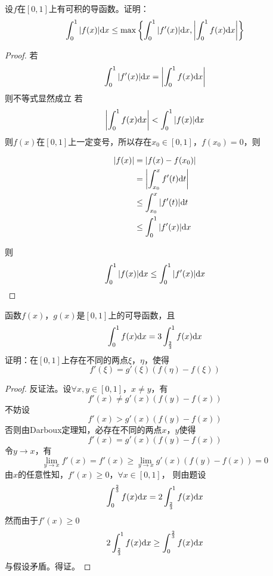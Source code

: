 \begin{proposition}

    设$f$在$[0, 1]$上有可积的导函数。证明：
    \[\int_{0}^{1}{|f(x)|}\mathrm{d} x \leq \max\left\{ \int_{0}^{1}{|f'(x)|}\mathrm{d} x,  \left| \int_{0}^{1}{f(x)}\mathrm{d} x \right| \right\}\]

\end{proposition}

\begin{proof}
    
    若
    \[\int_{0}^{1}{|f'(x)|}\mathrm{d} x = \left| \int_{0}^{1}{f(x)}\mathrm{d} x \right|\]
    则不等式显然成立
    若
    \[\left| \int_{0}^{1}{f(x)}\mathrm{d} x \right| < \int_{0}^{1}{|f(x)|}\mathrm{d} x\]
    则$f(x)$在$[0, 1]$上一定变号，所以存在$x_0 \in [0, 1]$，$f(x_0) = 0$，则

    \begin{align*}
        |f(x)| & = |f(x) - f(x_0)| \\
        & = \left| \int_{x_0}^{x}{f'(t)}\mathrm{d} t \right| \\
        & \leq \int_{x_0}^{x}{|f'(t)|}\mathrm{d} t \\
        & \leq \int_{0}^{1}{|f'(x)|}\mathrm{d} x
    \end{align*}

    则
    \[\int_{0}^{1}{|f(x)|}\mathrm{d} x \leq \int_{0}^{1}{|f'(x)|}\mathrm{d} x\]

\end{proof}

\begin{proposition}
    
    函数$f(x)$，$g(x)$是$[0, 1]$上的可导函数，且
    \[\int_{0}^{1}{f(x)}\mathrm{d} x = 3 \int_{\frac{2}{3}}^{1}{f(x)}\mathrm{d} x\]
    证明：在$[0, 1]$上存在不同的两点$\xi$，$\eta$，使得
    \[f'(\xi) = g'(\xi)(f(\eta) - f(\xi))\]

\end{proposition}

\begin{proof}

    反证法。设$\forall x, y \in [0, 1]$，$x \neq y$，有
    \[f'(x) \neq g'(x)(f(y) - f(x))\]
    不妨设
    \[f'(x) > g'(x)(f(y) - f(x))\]
    否则由\textup{Darboux}定理知，必存在不同的两点$x$，$y$使得
    \[f'(x) = g'(x)(f(y) - f(x))\]
    令$y \to x$，有
    \[\lim\limits_{y \to x}{f'(x)} = f'(x) \geq \lim\limits_{y \to x}{g'(x)(f(y) - f(x))} = 0\]
    由$x$的任意性知，$f'(x) \geq 0$，$\forall x \in [0, 1]$，
    则由题设
    \[\int_{0}^{\frac{2}{3}}{f(x)}\mathrm{d} x = 2 \int_{\frac{2}{3}}^{1}{f(x)}\mathrm{d} x\]
    然而由于$f'(x) \geq 0$
    \[2 \int_{\frac{2}{3}}^{1}{f(x)}\mathrm{d} x \geq \int_{0}^{\frac{2}{3}}{f(x)}\mathrm{d} x \]
    与假设矛盾。得证。

\end{proof}

